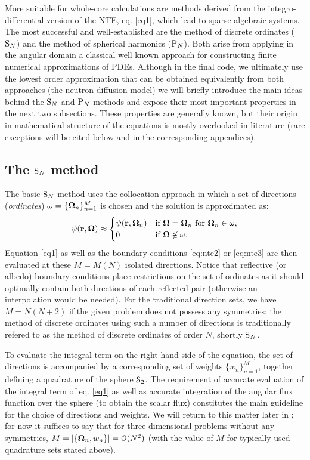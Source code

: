 \vspace*{1em}
More suitable for whole-core calculations are methods derived from the integro-differential
version of the NTE, eq.
\eqref{eq1}, which lead to sparse algebraic systems. The most successful and well-established are the method
of discrete ordinates ($\text{S}_{N}$) and the method of spherical harmonics ($\text{P}_{N}$).
Both arise from applying in the
angular domain a classical well known approach for constructing finite numerical
approximations of PDEs. Although in the final code, we ultimately use the lowest order approximation that can be obtained
equivalently from both approaches (the neutron diffusion model) we will briefly introduce the main ideas behind the
$\text{S}_{N}$ and $\text{P}_{N}$ methods and expose their most important properties in the next two subsections. These properties are
generally known, but their origin in mathematical structure of the equations is mostly overlooked in
literature (rare exceptions will be cited below and in the corresponding appendices). 

\subsection{The $\text{S}_{N}$ method}\label{sec:1-SN}
The basic $\text{S}_{N}$ method uses the collocation approach in which a set of directions (\textit{ordinates})
$\omega = \{\mathbf{\Omega}_n\}_{n=1}^{M}$ is chosen and the solution is approximated as:
\begin{equation}\label{eq:sn_approx} 
	\psi(\mathbf{r}, \mathbf{\Omega}) \approx 
		\begin{cases}\displaystyle \psi(\mathbf{r},\mathbf{\Omega}_n) & \mbox{if $\mathbf{\Omega} = \mathbf{\Omega}_n$ for $\mathbf{\Omega}_n \in \omega$},\\ 0 & \mbox{if $\mathbf{\Omega} \not \in \omega$.} \end{cases} 
\end{equation}
Equation \eqref{eq1} as well as the boundary conditions \eqref{eq:nte2} or \eqref{eq:nte3} are then evaluated at these
$M = M(N)$ isolated directions. Notice that reflective (or albedo) boundary conditions place restrictions on the set of
ordinates as it should optimally contain both directions of each reflected pair (otherwise an interpolation would be
needed). For the traditional direction sets, we have $M = N(N+2)$ if the given problem does not possess any symmetries;
the method of discrete ordinates using such a number of directions is traditionally refered to as the method of 
discrete ordinates of order $N$, shortly $\text{S}_{N}$.

To evaluate the integral term on the right hand side of the equation, the set of directions is accompanied by a
corresponding set of weights $\{w_n\}_{n=1}^{M}$, together defining a quadrature of the sphere $\mathcal{S}_2$. The
requirement of accurate evaluation of the integral term of eq.
\eqref{eq1} as well as accurate integration of the angular flux function over the sphere (to obtain the scalar flux)
constitutes the main guideline for the choice of directions and weights. We will return to this matter later in 
; for now it suffices to say that for three-dimensional problems without any symmetries, \mbox{$M = \left|\{\mathbf{\Omega}_n, w_n\}\right| = \mathcal{O}(N^2)$} (with the
value of $M$ for typically used quadrature sets stated above).

